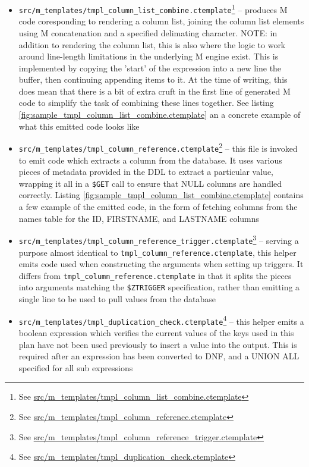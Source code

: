 \documentclass[]{article}
\def\code#1{\texttt{#1}}
\newcommand{\gitlab}[1]{\footnote{See \href{https://gitlab.com/YottaDB/DBMS/YDBOcto/blob/master/#1}{#1}}}
\begin{document}
\begin{itemize}
	\item \code{src/m\_templates/tmpl\_column\_list\_combine.ctemplate}\gitlab{src/m\_templates/tmpl\_column\_list\_combine.ctemplate} -- produces M code coresponding to rendering a column list, joining the column list elements using M concatenation and a specified delimating character. NOTE: in addition to rendering the column list, this is also where the logic to work around line-length limitations in the underlying M engine exist. This is implemented by copying the 'start' of the expression into a new line the buffer, then continuing appending items to it. At the time of writing, this does mean that there is a bit of extra cruft in the first line of generated M code to simplify the task of combining these lines together. See listing \ref{fig:sample_tmpl_column_list_combine.ctemplate} an a concrete example of what this emitted code looks like
	\item \code{src/m\_templates/tmpl\_column\_reference.ctemplate}\gitlab{src/m\_templates/tmpl\_column\_reference.ctemplate} -- this file is invoked to emit code which extracts a column from the database. It uses various pieces of metadata provided in the DDL to extract a particular value, wrapping it all in a \code{\$GET} call to ensure that NULL columns are handled correctly. Listing \ref{fig:sample_tmpl_column_list_combine.ctemplate} contains a few example of the emitted code, in the form of fetching columns from the names table for the ID, FIRSTNAME, and LASTNAME columns
	\item \code{src/m\_templates/tmpl\_column\_reference\_trigger.ctemplate}\gitlab{src/m\_templates/tmpl\_column\_reference\_trigger.ctemplate} -- serving a purpose almost identical to \code{tmpl\_column\_reference.ctemplate}, this helper emits code used when constructing the arguments when setting up triggers. It differs from \code{tmpl\_column\_reference.ctemplate} in that it splits the pieces into arguments matching the \code{\$ZTRIGGER} specification, rather than emitting a single line to be used to pull values from the database
	\item \code{src/m\_templates/tmpl\_duplication\_check.ctemplate}\gitlab{src/m\_templates/tmpl\_duplication\_check.ctemplate} -- this helper emits a boolean expression which verifies the current values of the  keys used in this plan have not been used previously to insert a value into the output. This is required after an expression has been converted to DNF, and a UNION ALL specified for all sub expressions

\end{itemize}
\end{document}
